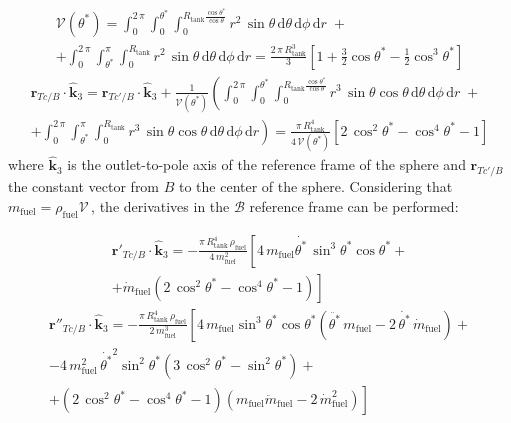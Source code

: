 \begin{multline}
	\mathcal{V}(\theta^*)=\int_{0}^{2\,\pi}\int_{0}^{\theta^*}\int_{0}^{R_{\text{tank}}\frac{\cos{\theta^*}}{\cos{\theta}}}r^2\,\sin{\theta\,\text{d}\theta}\,\text{d}\phi\,\text{d}r\;+\\
	+\int_{0}^{2\,\pi}\int_{\theta^*}^{\pi}\int_{0}^{R_{\text{tank}}}r^2\,\sin{\theta\,\text{d}\theta}\,\text{d}\phi\,\text{d}r= \frac{2\,\pi\,R_{\text{tank}}^3}{3}\left[1+\frac{3}{2}\cos{\theta^*}-\frac{1}{2}\cos^3{\theta^*}\right]
\end{multline}
\vspace{3pt}
\begin{multline}
	\bm{r}_{Tc/B}\cdot\bm{\hat{k}}_3 = \bm{r}_{Tc'/B}\cdot\bm{\hat{k}}_3 +  \frac{1}{\mathcal{V}(\theta^*)}\left(\int_{0}^{2\,\pi}\int_{0}^{\theta^*}\int_{0}^{R_{\text{tank}}\frac{\cos{\theta^*}}{\cos{\theta}}}r^3\,\sin{\theta}\cos{\theta}\,\text{d}\theta\,\text{d}\phi\,\text{d}r\;+\right.\\\left.+\int_{0}^{2\,\pi}\int_{\theta^*}^{\pi}\int_{0}^{R_{\text{tank}}}r^3\,\sin{\theta}\cos{\theta}\,\text{d}\theta\,\text{d}\phi\,\text{d}r\right)
	= \frac{\pi\,R_{\text{tank}}^4}
	{4\,\mathcal{V}(\theta^*)}\left[2\,\cos^2{\theta^*} - \cos^4{\theta^*}-1\right]
\end{multline}
\noindent
where $\bm{\hat{k}}_3$ is the outlet-to-pole axis of the reference frame of the sphere and $\bm{r}_{Tc'/B}$ the constant vector from $B$ to the center of the sphere.\newline
Considering that $m_{\text{fuel}}=\rho_{\text{fuel}}\mathcal{V}\,$, the derivatives in the $\mathcal{B}$ reference frame can be performed:

\begin{multline}
	\bm{r}'_{Tc/B}\cdot\bm{\hat{k}}_3 =- \frac{\pi\,R_{\text{tank}}^4\,\rho_{\text{fuel}}}{4\,m^2_{\text{fuel}}}\left[4\,m_{\text{fuel}}\dot{\theta^*}\,\sin^3{\theta^*}\cos{\theta^*} +\right.\\
	\left.+ \dot{m}_{\text{fuel}}\left(2\,\cos^2{\theta^*} - \cos^4{\theta^*}-1\right)\right]
\end{multline}
\begin{multline}
	\bm{r}''_{Tc/B}\cdot\bm{\hat{k}}_3 =- \frac{\pi\,R_{\text{tank}}^4\,\rho_{\text{fuel}}}{2\,m^3_{\text{fuel}}}\left[4\,m_{\text{fuel}}\sin^3{\theta^*}\cos{\theta^*} \left(\ddot{\theta^*}\,m_{\text{fuel}} - 2\,\dot{\theta^*}\,\dot{m}_{\text{fuel}}\right)+\right.\\
	\left.-4\,m^2_{\text{fuel}}\,\dot{\theta^*}^2\sin^2{\theta^*}\left(3\,\cos^2{\theta^*} -\sin^2{\theta^*}\right)+\right.\\
	+\left. \left(2\,\cos^2{\theta^*} - \cos^4{\theta^*}-1\right)\left(m_{\text{fuel}}\ddot{m}_{\text{fuel}} - 2\,\dot{m}^2_{\text{fuel}}\right)\right]
\end{multline}

